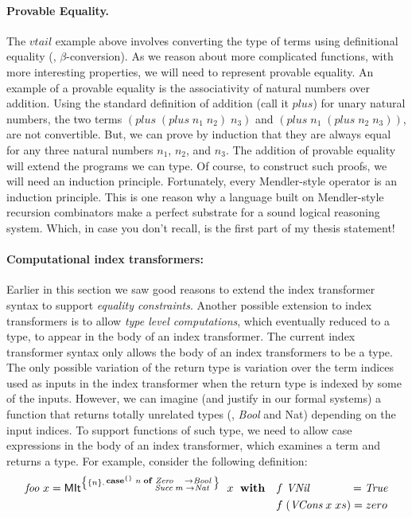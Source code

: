 \paragraph{Provable Equality.}
The $vtail$ example above involves converting the type of terms using
definitional equality (\ie, $\beta$-conversion). As we reason about more
complicated functions, with more interesting properties, we will need to
represent provable equality. An example of a provable equality is
the associativity of natural numbers over addition. Using the standard
definition of addition (call it $plus$) for unary natural numbers, the two terms
$(plus\;(plus\;n_1\;n_2)\;n_3)$ and $(plus\;n_1\;(plus\;n_2\;n_3))$,
are not convertible. But, we can prove by induction that they are always equal
for any three natural numbers $n_1$, $n_2$, and $n_3$. The addition of
provable equality will extend the programs we can type. Of course,
to construct such proofs, we will need an induction principle. Fortunately,
every Mendler-style operator is an induction principle. This is one reason
why a language built on Mendler-style recursion combinators make a perfect
substrate for a sound logical reasoning system. Which, in case you don't recall,
is the first part of my thesis statement!





\paragraph{Computational index transformers:}
Earlier in this section we saw good reasons to extend
the index transformer syntax to support \emph{equality constraints}.
Another possible extension to index transformers is to allow
\emph{type level computations}, which eventually reduced to a type,
to appear in the body of an index transformer. The current index
transformer syntax only allows the body of an index transformers to be a type.
The only possible variation of the return type is variation over
the term indices used as inputs in the index transformer
when the return type is indexed by some of the inputs. However, we can imagine
(and justify in our formal systems) 
a function that returns totally unrelated types (\eg, \textit{Bool} and Nat)
depending on the input indices. To support functions of such type, we need
to allow case expressions in the body of an index transformer, which examines
a term and returns a type. For example, consider the following definition:
\begin{align*}
\textit{foo}~x =
 \textsf{MIt}^{\left\{\{n\} . \begin{smallmatrix}\textbf{case}^{\{\}}\;n\;\textbf{of}
                                        &\textit{Zero}~~~  -> \textit{Bool} \\
                                        &\textit{Succ}\;m\;-> \textit{Nat}\;
                                        \end{smallmatrix}
       \right\}}~\;x~\;\textbf{with}
&\quad  f ~\textit{VNil}~~~~~~~~~~~ = \textit{True} \\
&\quad  f \;(\textit{VCons}\;x\;xs) = zero
\end{align*}

